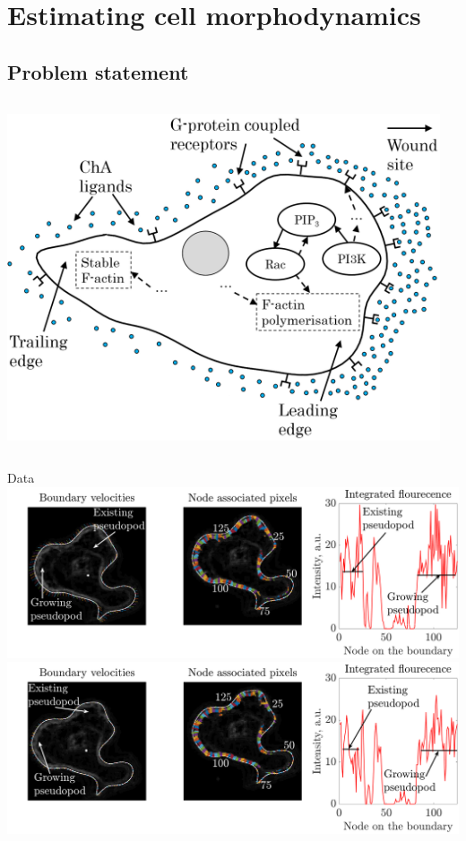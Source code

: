 \documentclass[mathserif,11pt]{beamer}
\begin{document}
\section{Estimating cell morphodynamics}
\subsection{Problem statement}
\begin{frame}
\begin{columns}
	\begin{column}{0.6\textwidth}
		\centering
		\includegraphics[scale=0.21]{Figures/sensing_neutrophil.png}
		\vfil		
	\end{column}
	\begin{column}{0.38\textwidth}
		\centering
		\scalebox{1}{	}
		\vfil
	\end{column}
\end{columns}
\bigskip
{}
\end{frame}
\begin{frame}{Data}\centering
\includegraphics[scale=0.2]{Figures/motile_cell_t10.png}
\vfil
\includegraphics[scale=0.2]{Figures/motile_cell_t11.png}
\end{frame}
\end{document}
